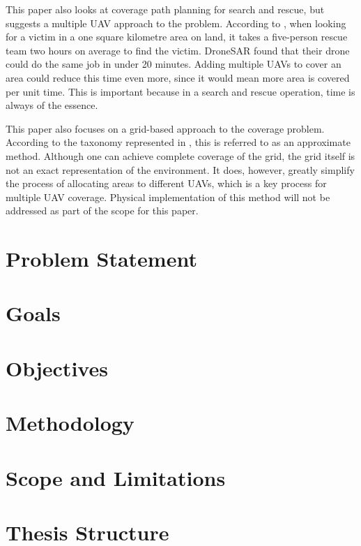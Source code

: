 This paper also looks at coverage path planning for search and rescue, but suggests a multiple UAV approach to the problem. According to \cite{DroneSAR01}, when looking for a victim in a one square kilometre area on land, it takes a five-person rescue team two hours on average to find the victim. DroneSAR found that their drone could do the same job in under 20 minutes.
Adding multiple UAVs to cover an area could reduce this time even more, since it would mean more area is covered per unit time. This is important because in a search and rescue operation, time is always of the essence.

This paper also focuses on a grid-based approach to the coverage problem. According to the taxonomy represented in \cite{Choset2001}, this is referred to as an approximate method. Although one can achieve complete coverage of the grid, the grid itself is not an exact representation of the environment. It does, however, greatly simplify the process of allocating areas to different UAVs, which is a key process for multiple UAV coverage. Physical implementation of this method will not be addressed as part of the scope for this paper.

\section{Problem Statement}
\label{sec:problemStatement}


\section{Goals}

\section{Objectives}

\section{Methodology}

\section{Scope and Limitations}

\section{Thesis Structure}
